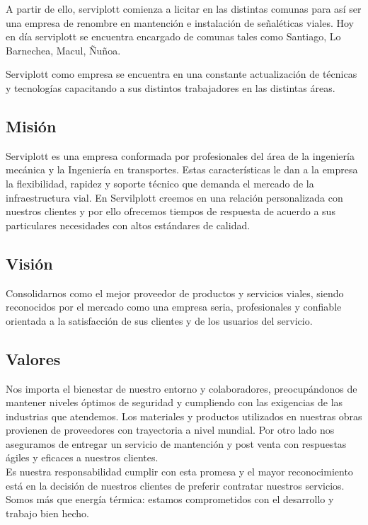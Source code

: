 A partir de ello, serviplott comienza a licitar en las distintas comunas para así ser una empresa de renombre en mantención e instalación de señaléticas viales. Hoy en día serviplott se encuentra encargado de comunas tales como Santiago, Lo Barnechea, Macul, Ñuñoa.\vspace{5mm}

Serviplott como empresa se encuentra en una constante actualización de técnicas y tecnologías capacitando a sus distintos trabajadores  en las distintas áreas. 
\vspace{5mm}
	\subsection{Misión}
	Serviplott es una empresa conformada por profesionales del área de la ingeniería mecánica y la Ingeniería en transportes. Estas características le dan a la empresa la flexibilidad, rapidez y soporte técnico que demanda el mercado de la infraestructura vial. En Servilplott creemos en una relación personalizada con nuestros clientes y por ello ofrecemos tiempos de respuesta de acuerdo a sus particulares necesidades con altos estándares de calidad.
	\subsection{Visión}
Consolidarnos como el mejor proveedor de productos y servicios viales, siendo reconocidos por el mercado como una empresa seria, profesionales y confiable orientada a la satisfacción de sus clientes y de los usuarios del servicio.

	\subsection{Valores}
	Nos importa el bienestar de nuestro entorno y colaboradores, preocupándonos de mantener niveles óptimos de seguridad y cumpliendo con las exigencias de las industrias que atendemos. Los materiales y productos utilizados en nuestras obras provienen de proveedores con trayectoria a nivel mundial. Por otro lado nos aseguramos de entregar un servicio de mantención y post venta con respuestas ágiles y eficaces a nuestros clientes.\\
\vspace{9mm}
Es nuestra responsabilidad cumplir con esta promesa y el mayor reconocimiento está en la decisión de nuestros clientes de preferir contratar nuestros servicios. Somos más que energía térmica: estamos comprometidos con el desarrollo y
trabajo bien hecho.

